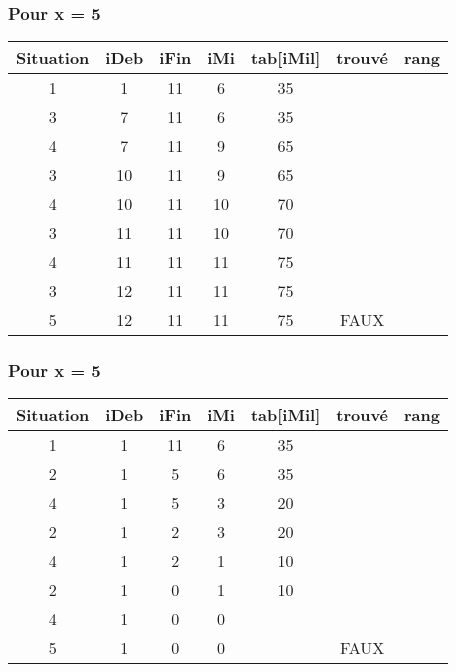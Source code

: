 \documentclass{article}
\begin{document}
			\subsubsection{Pour x = 5}
			\begin{tabular}{|c|c|c|c|c|c|c|}
				\hline
					\textbf{Situation} & \textbf{iDeb} & \textbf{iFin} & \textbf{iMi} & \textbf{tab[iMil]} & \textbf{trouvé} & \textbf{rang}\\
				\hline
					1 & 1 & 11 & 6 & 35 & &\\
				\hline
					3 & 7 & 11 & 6 & 35 & &\\ 
				\hline
					4 & 7 & 11 & 9 & 65 & &\\ 
				\hline
					3 & 10 & 11 & 9 & 65 & &\\ 
				\hline
					4 & 10 & 11 & 10 & 70 & &\\ 
				\hline
					3 & 11 & 11 & 10 & 70 & &\\ 
				\hline
					4 & 11 & 11 & 11 & 75 & &\\ 
				\hline
					3 & 12 & 11 & 11 & 75 & &\\ 
				\hline
					5 & 12 & 11 & 11 & 75 & FAUX &\\ 
				\hline
			\end{tabular}
			\subsubsection{Pour x = 5}
			\begin{tabular}{|c|c|c|c|c|c|c|}
				\hline
					\textbf{Situation} & \textbf{iDeb} & \textbf{iFin} & \textbf{iMi} & \textbf{tab[iMil]} & \textbf{trouvé} & \textbf{rang}\\
				\hline
					1 & 1 & 11 & 6 & 35 & &\\
				\hline
					2 & 1 & 5 & 6 & 35 & &\\ 
				\hline
					4 & 1 & 5 & 3 & 20 & &\\ 
				\hline
					2 & 1 & 2 & 3 & 20 & &\\ 
				\hline
					4 & 1 & 2 & 1 & 10 & &\\ 
				\hline
					2 & 1 & 0 & 1 & 10 & &\\ 
				\hline
					4 & 1 & 0 & 0 & & &\\ 
				\hline
					5 & 1 & 0 & 0 & & FAUX &\\ 
				\hline
			\end{tabular}
\end{document}
